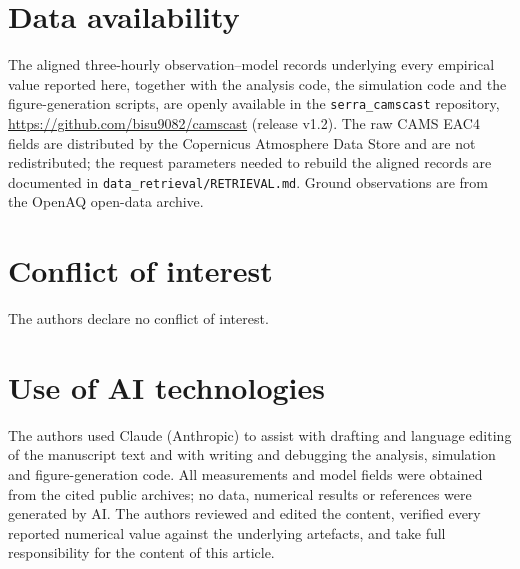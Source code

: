 \documentclass[12pt]{article}
\begin{document}
\section*{Data availability}
The aligned three-hourly observation--model records underlying every empirical value reported here,
together with the analysis code, the simulation code and the figure-generation scripts, are openly
available in the \texttt{serra\_camscast} repository,
\url{https://github.com/bisu9082/camscast} (release v1.2). The raw CAMS EAC4 fields are
distributed by the Copernicus Atmosphere Data Store and are not redistributed; the request
parameters needed to rebuild the aligned records are documented in
\texttt{data\_retrieval/RETRIEVAL.md}. Ground observations are from the OpenAQ open-data archive.

\section*{Conflict of interest}
The authors declare no conflict of interest.

\section*{Use of AI technologies}
The authors used Claude (Anthropic) to assist with drafting and language editing of the
manuscript text and with writing and debugging the analysis, simulation and figure-generation
code. All measurements and model fields were obtained from the cited public archives; no data,
numerical results or references were generated by AI. The authors reviewed and edited the
content, verified every reported numerical value against the underlying artefacts, and take
full responsibility for the content of this article.

\clearpage
{\singlespacing

}

\end{document}
